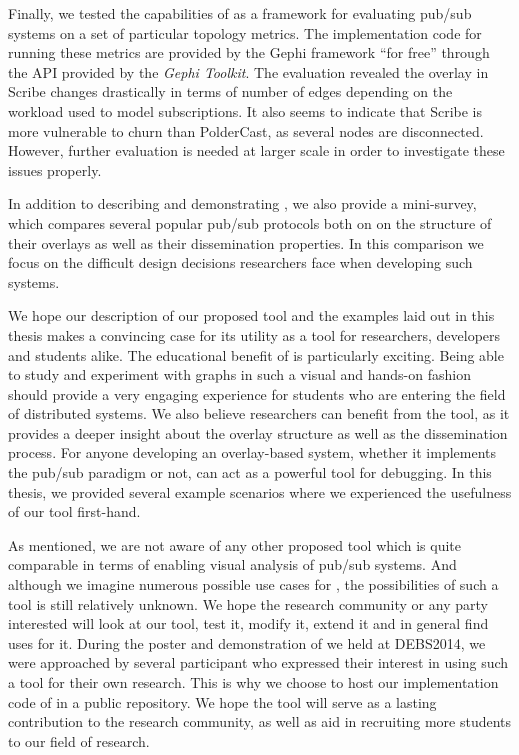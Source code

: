 Finally, we tested the capabilities of \demo{} as a framework for
evaluating pub/sub systems on a set of particular topology metrics. The
implementation code for running these metrics are provided by the Gephi
framework ``for free'' through the API provided by the \emph{Gephi
    Toolkit}. The evaluation revealed the overlay in Scribe changes
drastically in terms of number of edges depending on the workload used
to model subscriptions. It also seems to indicate that Scribe is more
vulnerable to churn than PolderCast, as several nodes are disconnected.
However, further evaluation is needed at larger scale in order to
investigate these issues properly.

In addition to describing and demonstrating \demo{}, we also provide a
mini-survey, which compares several popular pub/sub protocols both on
on the structure of their overlays as well as their dissemination
properties. In this comparison we focus on the difficult design
decisions researchers face when developing such systems.

We hope our description of our proposed tool and the examples laid out
in this thesis makes a convincing case for its utility as a tool for
researchers, developers and students alike. The educational benefit of
\demo{} is particularly exciting. Being able to study and experiment
with graphs in such a visual and hands-on fashion should provide a very
engaging experience for students who are entering the field of
distributed systems. We also believe researchers can benefit from the
tool, as it provides a deeper insight about the overlay structure as
well as the dissemination process. For anyone developing an
overlay-based system, whether it implements the pub/sub paradigm or not,
\demo{} can act as a powerful tool for debugging. In this thesis, we
provided several example scenarios where we experienced the usefulness
of our tool first-hand.

As mentioned, we are not aware of any other proposed tool which is quite
comparable in terms of enabling visual analysis of pub/sub systems. And
although we imagine numerous possible use cases for \demo{}, the
possibilities of such a tool is still relatively unknown. We hope  the
research community or any party interested will look at our tool, test
it, modify it, extend it and in general find uses for it. During the
poster and demonstration of \demo{} we held at DEBS2014, we were
approached by several participant who expressed their interest in using
such a tool for their own research.  This is why we choose to host our
implementation code of \demo{} in a public
repository. We hope the
tool will serve as a lasting contribution to the research community, as
well as aid in recruiting more students to our field of research.

